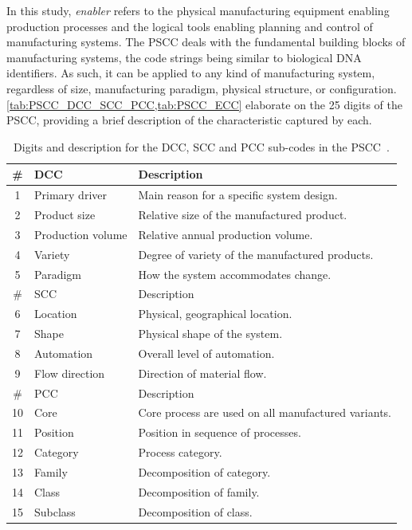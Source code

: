In this study, \emph{enabler} refers to the physical manufacturing equipment enabling production processes and the logical tools enabling planning and control of manufacturing systems.
The PSCC deals with the fundamental building blocks of manufacturing systems, the code strings being similar to biological DNA identifiers.
As such, it can be applied to any kind of manufacturing system, regardless of size, manufacturing paradigm, physical structure, or configuration.
\cref{tab:PSCC_DCC_SCC_PCC,tab:PSCC_ECC} elaborate on the 25 digits of the PSCC, providing a brief description of the characteristic captured by each.

\begin{table}[tb]
  \centering
  \caption[Digits and description for the DCC, SCC and PCC sub-codes in the PSCC.]
  {Digits and description for the DCC, SCC and PCC sub-codes in the PSCC~\parencite{SorensenClsfCoding}.}\label{tab:PSCC_DCC_SCC_PCC}
  \small
  \begin{tabular}{cll}
    \toprule
    \# & DCC & Description\\
    \midrule
    1 & Primary driver & Main reason for a specific system design.\\
    2 & Product size & Relative size of the manufactured product.\\
    3 & Production volume & Relative annual production volume.\\
    4 & Variety & Degree of variety of the manufactured products.\\
    5 & Paradigm & How the system accommodates change.\\
    \midrule
    \# & SCC & Description\\
    \midrule
    6 & Location & Physical, geographical location.\\
    7 & Shape & Physical shape of the system.\\
    8 & Automation & Overall level of automation.\\
    9 & Flow direction & Direction of material flow.\\
    \midrule
    \# & PCC & Description\\
    \midrule
    10 & Core & Core process are used on all manufactured variants.\\
    11 & Position & Position in sequence of processes.\\
    12 & Category & Process category.\\
    13 & Family & Decomposition of category.\\
    14 & Class & Decomposition of family.\\
    15 & Subclass & Decomposition of class.\\
    \bottomrule
  \end{tabular}
\end{table}
